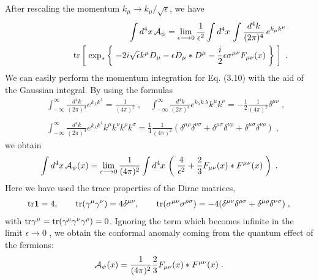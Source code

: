 \documentclass[a4paper,12pt]{article}
\begin{document}
After rescaling the momentum $k_{\mu} \rightarrow k_{\mu}/\sqrt{\epsilon}$, 
we have 
%
\begin{eqnarray}
& & \int d^{4}x \,{\cal A}_{\psi} = 
\lim_{\epsilon \longrightarrow 0} \frac{1}{\epsilon^{2}}
\int d^{4}x \, \int \frac{d^{4}k}{(2\pi)^{4}} \,e^{k_{\mu}k^{\mu}}\,
\nonumber \\
& & \qquad \qquad 
{\rm tr} \left[ \; \exp_{\ast} \left\{ \; -2i\sqrt{\epsilon}k^{\mu} D_{\mu} 
- \epsilon D_{\mu} \ast D^{\mu} 
- \frac{i}{2}\epsilon \sigma^{\mu\nu}F_{\mu\nu}(x) \; \right\} 
\;\right]\;.
\end{eqnarray}
%
We can easily perform the momentum integration for Eq. (3.10) with the aid of 
the Gaussian integral. By using the formulas 
%
\begin{eqnarray}
& & \int^{\infty}_{-\infty}\frac{d^{4}k}{(2\pi)^{4}}
e^{k_{\lambda}k^{\lambda}} = \frac{1}{(4\pi)^{2}} \;, \quad 
\int^{\infty}_{-\infty}\frac{d^{4}k}{(2\pi)^{4}}
e^{k_{\lambda}k~{\lambda}} k^{\mu}k^{\nu} 
= -\frac{1}{2} \frac{1}{(4\pi)^{2}} \delta^{\mu\nu} \;, \nonumber \\
& & \\
& & \int^{\infty}_{-\infty}\frac{d^{4}k}{(2\pi)^{4}}
e^{k_{\lambda}k^{\lambda}} 
k^{\mu}k^{\nu}k^{\rho}k^{\sigma} 
= \frac{1}{4} \frac{1}{(4\pi)^{2}} 
(\delta^{\mu\rho}\delta^{\nu\sigma}
+\delta^{\mu\sigma}\delta^{\nu\rho}+\delta^{\mu\sigma}\delta^{\nu\rho}) \;,
\nonumber 
\end{eqnarray}
%
we obtain 
%
\begin{eqnarray}
\int d^{4}x \,
{\cal A}_{\psi}(x) = \lim_{\epsilon \longrightarrow 0} 
\frac{1}{(4\pi)^{2}}  
\int d^{4}x \,
\left( \; \frac{4}{\epsilon^{2}} 
 + \frac{2}{3} F_{\mu\nu}(x) \ast F^{\mu\nu}(x) \;\right) \;.
\end{eqnarray}
%
Here we have used the trace properties of the Dirac matrices, 
%
\begin{eqnarray}
{\rm tr} \mbox{\boldmath $1$} =4, \qquad 
{\rm tr}(\gamma^{\mu}\gamma^{\nu}) = 4\delta^{\mu\nu}, \qquad
{\rm tr}(\sigma^{\mu\nu}\sigma^{\rho\sigma}) =
 - 4(\delta^{\mu\nu}\delta^{\rho\sigma}+\delta^{\mu\rho}\delta^{\nu\sigma}) 
\;, \nonumber 
\end{eqnarray}
%
%
with ${\rm tr}\gamma^{\mu} = {\rm tr}(\gamma^{\mu}\gamma^{\nu}\gamma^{\rho}) 
=0$. Ignoring the term which becomes infinite in the limit 
$\epsilon \longrightarrow 0$ \cite{KF}, we obtain 
the conformal anomaly coming from the quantum effect of the fermions: 
%
\begin{eqnarray}
{\cal A}_{\psi}(x) =  
\frac{1}{(4\pi)^{2}}  \frac{2}{3} F_{\mu\nu}(x) \ast F^{\mu\nu}(x) \;.
\end{eqnarray}
%
%
\setcounter{subsection}{1}
\end{document}
